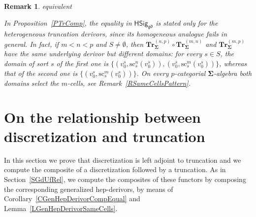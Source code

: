 \documentclass[a4paper, reqno]{amsbook}
\makeatletter
\newcommand{\sig}[1]{\mathbf{#1}}             %
\newcommand{\gd}{\mathfrak{gd}}              %
\newcommand{\src}{\mathrm{sc}}
\newcommand{\bTr}{\mathbf{Tr}}
\theoremstyle{plain}
\newtheorem{remark}[theorem]{Remark}
\theoremstyle{definition}
\newcommand*{\CA@leanpending}{}
\newcommand*{\CA@leanrelation}{}
\newcommand*{\lean}[2]{%
  \ifcsname\string\color@lean@#1\endcsname\else
    \PackageError{main}{Unknown relation `#1' in \string\lean}{Use equivalent, weaker or stronger.}%
  \fi
  \gdef\CA@leanrelation{#1}%
  \gdef\CA@leanpending{#2}}
\makeatother
\begin{document}
\begin{remark}\label{RTrCompHomogeneous}\lean{equivalent}{Dimensions.homogeneousTruncation_comp_derivor,Dimensions.homogeneousTruncation_comp_ne,Dimensions.homogeneousTruncation_comp_sameCells}
In Proposition~\ref{PTrComp}, the equality in $\mathsf{HSig}_{\gd}$ is stated only for the heterogeneous truncation derivors, since its homogeneous analogue fails in general.
In fact, if $m<n<p$ and $S\neq\emptyset$, then $\bTr^{(n,p)}_{\sig{\Sigma}}\circ\bTr^{(m,n)}_{\sig{\Sigma}}$ and $\bTr^{(m,p)}_{\sig{\Sigma}}$ have the same underlying derivor but different domains: for every $s\in S$, the domain of sort $s$ of the first one is $\{(v^s_0,\src^n_s(v^s_0)),(v^s_0,\src^m_s(v^s_0))\}$, whereas that of the second one is $\{(v^s_0,\src^m_s(v^s_0))\}$.
On every $p$-categorial $\sig{\Sigma}$-algebra both domains select the $m$-cells, see Remark~\ref{RSameCellsPattern}.
\end{remark}

\section{On the relationship between discretization and truncation}\label{SDsTrRel}

In this section we prove that discretization is left adjoint to truncation and we compute the composite of a discretization followed by a truncation.
As in Section~\ref{SGdUfRel}, we compute the composites of these functors by composing the corresponding generalized hep-derivors, by means of Corollary~\ref{CGenHepDerivorCompEqual} and Lemma~\ref{LGenHepDerivorSameCells}.
\end{document}
